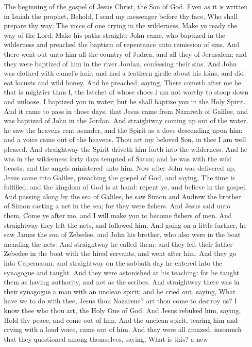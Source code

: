 


The beginning of the gospel of Jesus Christ, the Son of God.  Even as it is written in Isaiah the prophet, Behold, I send my messenger before thy face, Who shall prepare thy way;  The voice of one crying in the wilderness, Make ye ready the way of the Lord, Make his paths straight;  John came, who baptized in the wilderness and preached the baptism of repentance unto remission of sins. And there went out unto him all the country of Judæa, and all they of Jerusalem; and they were baptized of him in the river Jordan, confessing their sins. And John was clothed with camel’s hair, and had a leathern girdle about his loins, and did eat locusts and wild honey. And he preached, saying, There cometh after me he that is mightier than I, the latchet of whose shoes I am not worthy to stoop down and unloose. I baptized you in water; but he shall baptize you in the Holy Spirit.  And it came to pass in those days, that Jesus came from Nazareth of Galilee, and was baptized of John in the Jordan. And straightway coming up out of the water, he saw the heavens rent asunder, and the Spirit as a dove descending upon him: and a voice came out of the heavens, Thou art my beloved Son, in thee I am well pleased.  And straightway the Spirit driveth him forth into the wilderness. And he was in the wilderness forty days tempted of Satan; and he was with the wild beasts; and the angels ministered unto him.  Now after John was delivered up, Jesus came into Galilee, preaching the gospel of God, and saying, The time is fulfilled, and the kingdom of God is at hand: repent ye, and believe in the gospel.  And passing along by the sea of Galilee, he saw Simon and Andrew the brother of Simon casting a net in the sea; for they were fishers. And Jesus said unto them, Come ye after me, and I will make you to become fishers of men. And straightway they left the nets, and followed him. And going on a little further, he saw James the son of Zebedee, and John his brother, who also were in the boat mending the nets. And straightway he called them: and they left their father Zebedee in the boat with the hired servants, and went after him.  And they go into Capernaum; and straightway on the sabbath day he entered into the synagogue and taught. And they were astonished at his teaching: for he taught them as having authority, and not as the scribes. And straightway there was in their synagogue a man with an unclean spirit; and he cried out, saying, What have we to do with thee, Jesus thou Nazarene? art thou come to destroy us? I know thee who thou art, the Holy One of God. And Jesus rebuked him, saying, Hold thy peace, and come out of him. And the unclean spirit, tearing him and crying with a loud voice, came out of him. And they were all amazed, insomuch that they questioned among themselves, saying, What is this? a new 